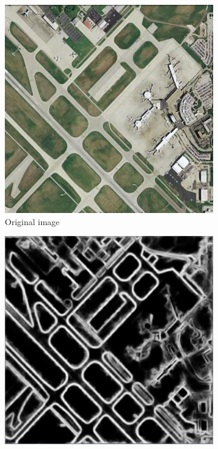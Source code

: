 \documentclass[conference]{IEEEtran}
\begin{document}
\begin{figure}
  \begin{center}
    \begin{subfigure}[b]{0.48\linewidth}
        \centerline{\includegraphics[width=\linewidth]{original_noHED.jpg}}
        \caption{Original image \label{subfig:orig_noHED}}
    \end{subfigure}
    \end{center}
     \begin{subfigure}[b]{0.48\linewidth}
        \centerline{\includegraphics[width=\linewidth]{HED.JPG}}

\end{subfigure}
\end{figure}
\end{document}
